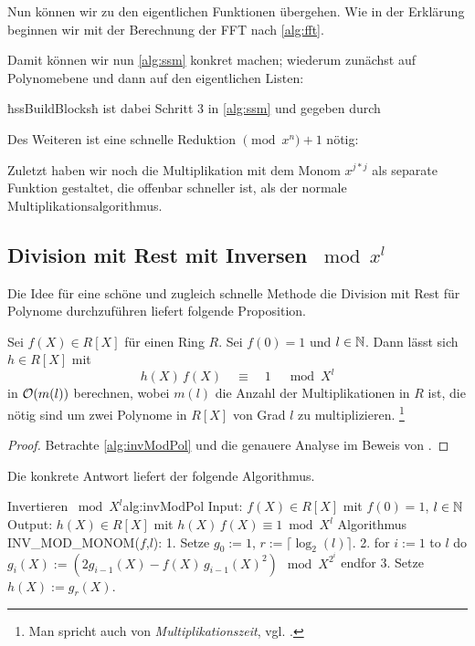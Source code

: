 Nun können wir zu den eigentlichen Funktionen übergehen.
Wie in der Erklärung beginnen wir mit der Berechnung der FFT nach 
\autoref{alg:fft}.

Damit können wir nun \autoref{alg:ssm} konkret machen; wiederum zunächst auf
Polynomebene und dann auf den eigentlichen Listen:

ħssBuildBlocksħ ist dabei Schritt 3 in \autoref{alg:ssm} und gegeben durch

Des Weiteren ist eine schnelle Reduktion $\pmod x^n+1$ nötig:

Zuletzt haben wir noch die Multiplikation mit dem Monom $x^{j*j}$ als separate
Funktion gestaltet, die offenbar schneller ist, als der normale
Multiplikationsalgorithmus.

\subsection{Division mit Rest mit Inversen $\bmod x^l$}
Die Idee für eine schöne und zugleich schnelle Methode die 
Division mit Rest für Polynome durchzuführen liefert folgende Proposition.

\begin{prop}
  Sei $f(X) \in R[X]$ für einen Ring $R$. Sei $f(0) = 1$ und 
  $l \in \mathbb{N}$. Dann lässt sich $h \in R[X]$ mit
  \[ h(X)\, f(X) \quad\equiv\quad 1 \quad \bmod X^l\]
  in $\mathcal{O}(m(l))$ berechnen,
  wobei $m(l)$ die Anzahl der Multiplikationen in $R$ ist, die nötig sind 
  um zwei Polynome in $R[X]$ von Grad $l$ zu multiplizieren.%
  \footnote{Man spricht auch von \emph{Multiplikationszeit}, 
  vgl. \autocite[Definition 2]{divHensel}.}
\end{prop}
\begin{proof}
  Betrachte \autoref{alg:invModPol} und die genauere Analyse im Beweis von
  \autocite[Theorem 2]{divHensel}.
\end{proof}

Die konkrete Antwort liefert der folgende Algorithmus.

\begin{pseudocode}{Invertieren $\bmod X^l$}{alg:invModPol}
Input: $f(X) \in R[X]$ mit $f(0)=1$, $l\in \mathbb{N}$
Output: $h(X) \in R[X]$ mit $h(X)\,f(X) \equiv 1 \bmod X^l$
Algorithmus INV_MOD_MONOM($f$,$l$):
  1. Setze $g_0 := 1$, $r := \lceil \log_2(l)\rceil$.
  2. for $i:=1$ to $l$ do
        $g_i(X) := (2 g_{i-1}(X) - f(X)\,g_{i-1}(X)^2)\ \bmod X^{2^i}$
     endfor
  3. Setze $h(X) := g_r(X)$.
\end{pseudocode}

